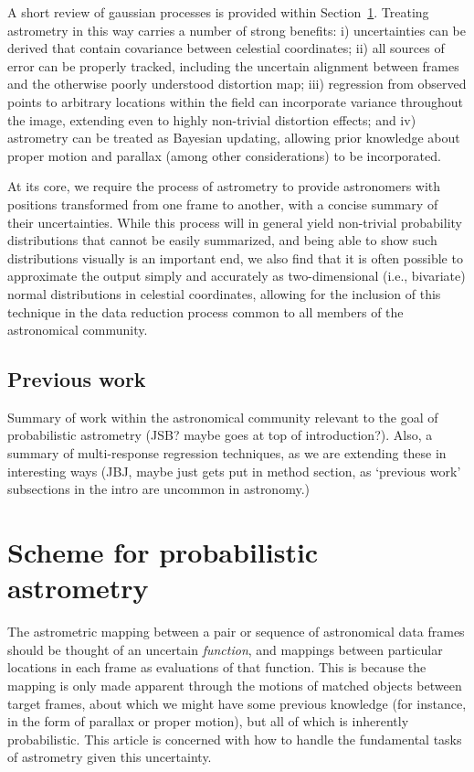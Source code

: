 \documentclass[manuscript]{aastex}
\begin{document}
A short review of gaussian processes is provided within Section~\ref{sec:scheme}. Treating astrometry in this way carries a number of strong benefits: i) uncertainties can be derived that contain covariance between celestial coordinates; ii) all sources of error can be properly tracked, including the uncertain alignment between frames and the otherwise poorly understood distortion map; iii) regression from observed points to arbitrary locations within the field can incorporate variance throughout the image, extending even to highly non-trivial distortion effects; and iv) astrometry can be treated as Bayesian updating, allowing prior knowledge about proper motion and parallax (among other considerations) to be incorporated.

At its core, we require the process of astrometry to provide astronomers with positions transformed from one frame to another, with a concise summary of their uncertainties. While this process will in general yield non-trivial probability distributions that cannot be easily summarized, and being able to show such distributions visually is an important end, we also find that it is often possible to approximate the output simply and accurately as two-dimensional (i.e., bivariate) normal distributions in celestial coordinates, allowing for the inclusion of this technique in the data reduction process common to all members of the astronomical community.

\subsection{Previous work}
Summary of work within the astronomical community relevant to the goal of probabilistic astrometry (JSB? maybe goes at top of introduction?). Also, a summary of multi-response regression techniques, as we are extending these in interesting ways (JBJ, maybe just gets put in method section, as `previous work' subsections in the intro are uncommon in astronomy.)

\section{Scheme for probabilistic astrometry}\label{sec:scheme}
The astrometric mapping between a pair or sequence of astronomical data frames should be thought of an uncertain \emph{function}, and mappings between particular locations in each frame as evaluations of that function. This is because the mapping is only made apparent through the motions of matched objects between target frames, about which we might have some previous knowledge (for instance, in the form of parallax or proper motion), but all of which is inherently probabilistic. This article is concerned with how to handle the fundamental tasks of astrometry given this uncertainty.
\end{document}
